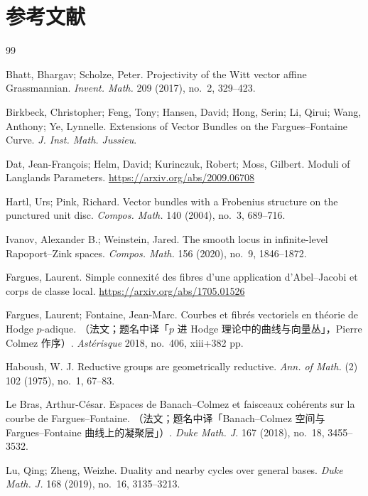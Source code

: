 \chapter*{参考文献}
\begin{thebibliography}{99}

 Bhatt, Bhargav; Scholze, Peter. Projectivity of the Witt vector affine
Grassmannian. \emph{Invent. Math.} 209 (2017), no.~2, 329--423.

 Birkbeck, Christopher; Feng, Tony; Hansen, David; Hong, Serin;
Li, Qirui; Wang, Anthony; Ye, Lynnelle. Extensions of Vector Bundles on the
Fargues--Fontaine Curve. \emph{J. Inst. Math. Jussieu}.

 Dat, Jean-Fran\c{c}ois; Helm, David; Kurinczuk, Robert; Moss, Gilbert.
Moduli of Langlands Parameters. \url{https://arxiv.org/abs/2009.06708}

 Hartl, Urs; Pink, Richard. Vector bundles with a Frobenius structure on the
punctured unit disc. \emph{Compos. Math.} 140 (2004), no.~3, 689--716.

 Ivanov, Alexander B.; Weinstein, Jared. The smooth locus in infinite-level
Rapoport--Zink spaces. \emph{Compos. Math.} 156 (2020), no.~9, 1846--1872.

 Fargues, Laurent. Simple connexit\'e des fibres d'une application
d'Abel--Jacobi et corps de classe local. \url{https://arxiv.org/abs/1705.01526}

 Fargues, Laurent; Fontaine, Jean-Marc. Courbes et fibr\'es vectoriels en
th\'eorie de Hodge $p$-adique. （法文；题名中译「$p$ 进 Hodge 理论中的曲线与向量丛」，Pierre Colmez
作序）. \emph{Ast\'erisque} 2018, no.~406, xiii+382 pp.

 Haboush, W. J. Reductive groups are geometrically reductive.
\emph{Ann. of Math.} (2) 102 (1975), no.~1, 67--83.

 Le Bras, Arthur-C\'esar. Espaces de Banach--Colmez et faisceaux coh\'erents
sur la courbe de Fargues--Fontaine. （法文；题名中译「Banach--Colmez 空间与 Fargues--Fontaine
曲线上的凝聚层」）. \emph{Duke Math. J.} 167 (2018), no.~18, 3455--3532.

 Lu, Qing; Zheng, Weizhe. Duality and nearby cycles over general bases.
\emph{Duke Math. J.} 168 (2019), no.~16, 3135--3213.


\end{thebibliography}

